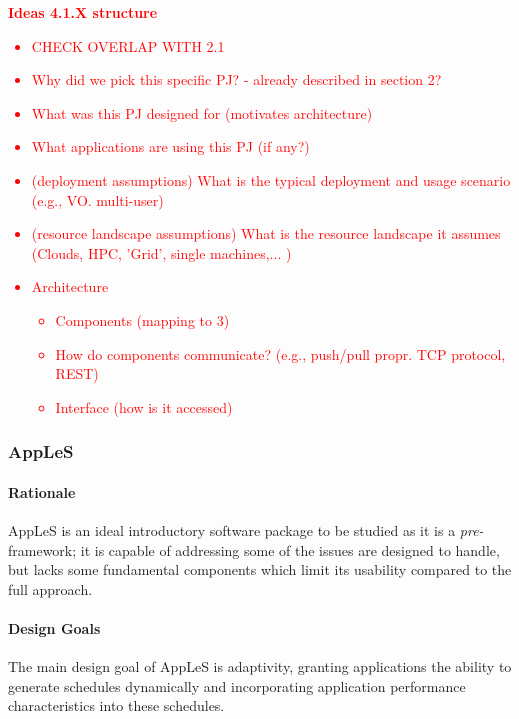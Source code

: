 \documentclass{sig-alternate}
\begin{document}
\textcolor{red}
{
\textbf{Ideas 4.1.X structure}
\begin{itemize}
\item CHECK OVERLAP WITH 2.1
\item Why did we pick this specific PJ? - already described in section 2? 
\item What was this PJ designed for (motivates architecture)
\item What applications are using this PJ (if any?)
\item (deployment assumptions) What is the typical deployment and usage scenario (e.g., VO. multi-user)
\item (resource landscape assumptions) What is the resource landscape it assumes (Clouds, HPC, 'Grid', single machines,... )
\item Architecture
  \begin{itemize}
    \item Components (mapping to 3)
    \item How do components communicate? (e.g., push/pull propr. TCP protocol, REST)
    \item Interface (how is it accessed)
  \end{itemize}
\end{itemize}
}


%
\subsubsection{AppLeS}
\paragraph{Rationale}
AppLeS is an ideal introductory software package to be studied
as it is a \textit{pre-\pilot} framework; it is capable of
addressing some of the issues \pilotjobs are designed to handle,
but lacks some fundamental components which limit its usability
compared to the full \pilotjob approach.

\paragraph{Design Goals}
The main design goal of AppLeS is adaptivity, granting applications
the ability to generate schedules dynamically and incorporating
application performance characteristics into these schedules.
\end{document}
